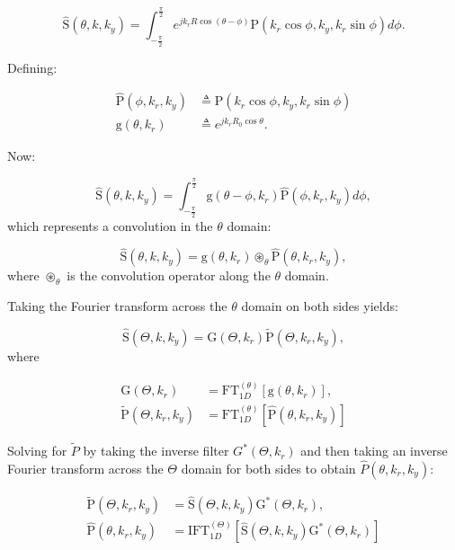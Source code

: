 \documentclass[conference]{IEEEtran}
\begin{document}
		\begin{equation}
		\hat{\text{S}}(\theta,k,k_y) = \int_{-\frac{\pi}{2}}^{\frac{\pi}{2}} e^{jk_rR\cos(\theta-\phi)} \text{P}(k_r\cos\phi,k_y,k_r\sin\phi)d\phi. 
		\end{equation}
		
		Defining:
		
		\begin{align}
		\label{Eq_mimo_r_isar_signal_expanded_3}
		\hat{\text{P}}(\phi,k_r,k_y) &\triangleq \text{P}(k_r\cos\phi,k_y,k_r\sin\phi) \\
		\text{g}(\theta,k_r) &\triangleq e^{jk_rR_0\cos\theta}.
		\end{align}
		
		Now:
		
		\begin{equation}
		\hat{\text{S}}(\theta,k,k_y) = \int_{-\frac{\pi}{2}}^{\frac{\pi}{2}} \text{g}(\theta-\phi,k_r) \hat{\text{P}}(\phi,k_r,k_y)d\phi, 
		\end{equation}
		which represents a convolution in the $\theta$ domain:
		
		\begin{equation}
		\hat{\text{S}}(\theta,k,k_y) = \text{g}(\theta,k_r) \circledast_\theta \hat{\text{P}}(\theta,k_r,k_y),
		\end{equation}
		where $\circledast_\theta$ is the convolution operator along the $\theta$ domain.
		
		Taking the Fourier transform across the $\theta$ domain on both sides yields:
		
		\begin{equation}
		\hat{\text{S}}(\Theta,k,k_y) = \text{G}(\Theta,k_r)\tilde{\text{P}}(\Theta,k_r,k_y),
		\end{equation}
		where
		
		\begin{align}
		\text{G}(\Theta,k_r) &= \text{FT}_{1D}^{(\theta)}[\text{g}(\theta,k_r)],\\
		\tilde{\text{P}}(\Theta,k_r,k_y) &= \text{FT}_{1D}^{(\theta)}[\hat{\text{P}}(\theta,k_r,k_y)]
		\end{align}
		
		Solving for $\tilde{P}$ by taking the inverse filter $G^*(\Theta,k_r)$ and then taking an inverse Fourier transform across the $\Theta$ domain for both sides to obtain $\hat{P}(\theta,k_r,k_y)$:
		
		\begin{align}
		\tilde{\text{P}}(\Theta,k_r,k_y) &= \hat{\text{S}}(\Theta,k,k_y)\text{G}^*(\Theta,k_r), \\
		\hat{\text{P}}(\theta,k_r,k_y) &= \text{IFT}_{1D}^{(\Theta)}\left[ \hat{\text{S}}(\Theta,k,k_y)\text{G}^*(\Theta,k_r) \right]
		\end{align}
		
\end{document}
